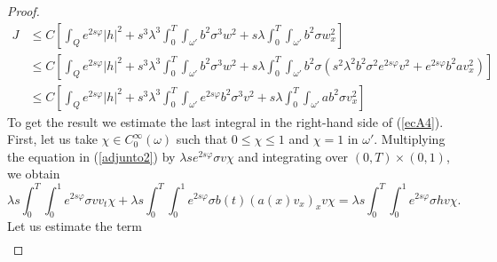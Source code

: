 \documentclass[11pt,oneside,a4papper]{osajnl}
\begin{document}
\begin{proof}
\begin{equation}
\begin{split}
		J &\leq C\left[ \int_Q e^{2s\varphi} |h|^2 + s^3\lambda^3 \int_0^T \int_{\omega'} b^2\sigma^3 w^2 + s\lambda \int_0^T \int_{\omega'} b^2\sigma w_x^2  \right] \\
        &\leq C\left[ \int_Q e^{2s\varphi} |h|^2 + s^3\lambda^3 \int_0^T \int_{\omega'} b^2\sigma^3 w^2 + s\lambda \int_0^T \int_{\omega'} b^2\sigma \left(  s^2\lambda^2b^2\sigma^2 e^{2s\varphi}v^2+ e^{2s\varphi}b^2av_x^2\right)  \right]\\
		&\leq C\left[ \int_Q e^{2s\varphi} |h|^2 + s^3\lambda^3 \int_0^T \int_{\omega'} e^{2s\varphi}b^2\sigma^3 v^2 + s\lambda \int_0^T \int_{\omega'} ab^2\sigma v_x^2  \right]
        \end{split}
	\end{equation}
    To get the result we estimate the last integral in the right-hand side of (\ref{ecA4}). First, let us take $\chi\in C_0^\infty(\omega)$ such that $0\leq \chi \leq 1$ and $\chi =1 $ in $\omega'$. Multiplying the equation in (\ref{adjunto2}) by $\lambda s e^{2s\varphi}\sigma v \chi$ and integrating over $(0,T)\times (0,1)$, we obtain
	\begin{equation}\label{ecA5}
        \lambda s\int_0^T \int_0^{1}  e^{2s\varphi}\sigma v v_t \chi +\lambda s \int_0^T \int_0^{1}e^{2s\varphi}\sigma b(t)\left(a(x)v_x\right)_x v\chi =\lambda s \int_0^T \int_0^{1}e^{2s\varphi} \sigma h v \chi.
	\end{equation}
    Let us estimate the term %
    \begin{multline*}

\end{multline*}
\end{proof}
\end{document}

